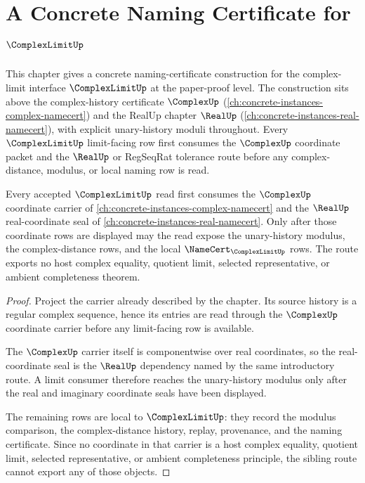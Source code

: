 \chapter{A Concrete Naming Certificate for \(\ComplexLimitUp\)}
\label{ch:concrete-instances-complex-limit-namecert}

This chapter gives a concrete naming-certificate construction for the complex-limit interface $\ComplexLimitUp$ at the paper-proof level. The construction sits above the complex-history certificate $\ComplexUp$ (\autoref{ch:concrete-instances-complex-namecert}) and the RealUp chapter $\RealUp$ (\autoref{ch:concrete-instances-real-namecert}), with explicit unary-history moduli throughout. Every $\ComplexLimitUp$ limit-facing row first consumes the $\ComplexUp$ coordinate packet and the $\RealUp$ or RegSeqRat tolerance route before any complex-distance, modulus, or local naming row is read.

\begin{theorem}
\label{thm:complex-limit-real-coordinate-sibling-route}
Every accepted $\ComplexLimitUp$ read first consumes the $\ComplexUp$ coordinate carrier of \autoref{ch:concrete-instances-complex-namecert} and the $\RealUp$ real-coordinate seal of \autoref{ch:concrete-instances-real-namecert}. Only after those coordinate rows are displayed may the read expose the unary-history modulus, the complex-distance rows, and the local $\NameCert_{\ComplexLimitUp}$ rows. The route exports no host complex equality, quotient limit, selected representative, or ambient completeness theorem.
\end{theorem}
\begin{proof}
Project the carrier already described by the chapter. Its source history is a regular complex sequence, hence its entries are read through the $\ComplexUp$ coordinate carrier before any limit-facing row is available.

The $\ComplexUp$ carrier itself is componentwise over real coordinates, so the real-coordinate seal is the $\RealUp$ dependency named by the same introductory route. A limit consumer therefore reaches the unary-history modulus only after the real and imaginary coordinate seals have been displayed.

The remaining rows are local to $\ComplexLimitUp$: they record the modulus comparison, the complex-distance history, replay, provenance, and the naming certificate. Since no coordinate in that carrier is a host complex equality, quotient limit, selected representative, or ambient completeness principle, the sibling route cannot export any of those objects.
\end{proof}

